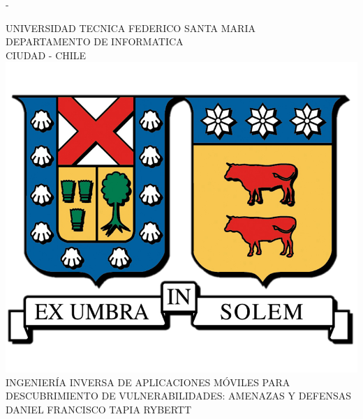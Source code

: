 %
%
% 
%
%
\begin{titlingpage}
\begin{SingleSpace}
\calccentering{\unitlength} 
\begin{adjustwidth*}{\unitlength}{-\unitlength}
\vspace*{13mm}
\begin{center}

{\Large UNIVERSIDAD TECNICA FEDERICO SANTA MARIA}\\[5mm]
{\Large DEPARTAMENTO DE INFORMATICA}\\
\vspace{4.5mm}
{\Large CIUDAD - CHILE}\\


\vspace{11mm}
\includegraphics[scale=0.4]{logos/utfsm_logo.png}\\
\vspace{11mm}
{\Large INGENIERÍA INVERSA DE APLICACIONES MÓVILES PARA DESCUBRIMIENTO
             DE VULNERABILIDADES: AMENAZAS Y DEFENSAS}\\[5mm]
\vspace{11mm}
{\Large\textsc{DANIEL FRANCISCO TAPIA RYBERTT}}\\


\end{center}
\end{adjustwidth*}
\end{SingleSpace}
\end{titlingpage}
